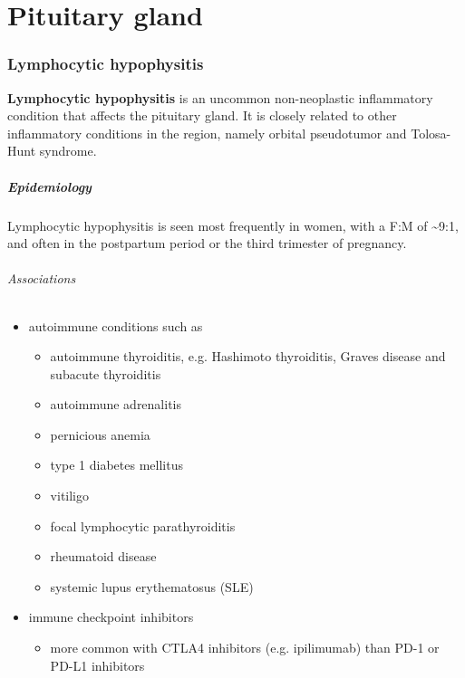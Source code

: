 \chapter{Pituitary gland}
\subsection{Lymphocytic hypophysitis}

\textbf{Lymphocytic hypophysitis} is an uncommon non-neoplastic inflammatory condition that affects the pituitary gland. It is closely related to other inflammatory conditions in the region, namely orbital pseudotumor and Tolosa-Hunt syndrome.

\paragraph{Epidemiology}

Lymphocytic hypophysitis is seen most frequently in women, with a F:M of \textasciitilde9:1, and often in the postpartum period or the third trimester of pregnancy.

\subparagraph{Associations}

\begin{itemize}
	\item
	autoimmune conditions such as
	
	\begin{itemize}
		\item
		autoimmune thyroiditis, e.g. Hashimoto thyroiditis, Graves disease and subacute thyroiditis
		\item
		autoimmune adrenalitis
		\item
		pernicious anemia
		\item
		type 1 diabetes mellitus
		\item
		vitiligo
		\item
		focal lymphocytic parathyroiditis
		\item
		rheumatoid disease
		\item
		systemic lupus erythematosus (SLE)
	\end{itemize}
	\item
	immune checkpoint inhibitors
	
	\begin{itemize}
		\item
		more common with CTLA4 inhibitors (e.g. ipilimumab) than PD-1 or PD-L1 inhibitors 
	\end{itemize}
\end{itemize}

